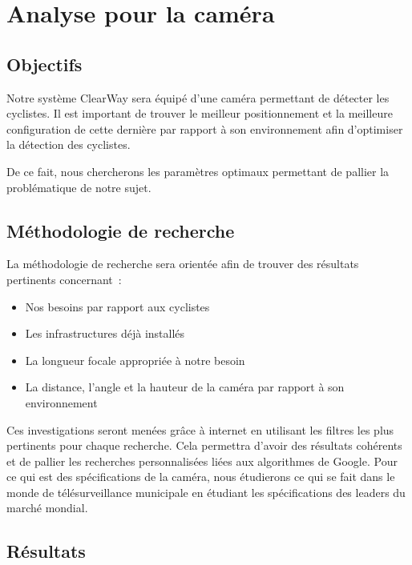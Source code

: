 
\section{Analyse pour la caméra}
\label{sec:camera}

\subsection{Objectifs}
\label{sec:camera_Objectifs}

Notre système ClearWay sera équipé d'une caméra permettant de détecter les cyclistes.
Il est important de trouver le meilleur positionnement et la meilleure configuration
de cette dernière par rapport à son environnement afin d'optimiser la détection des cyclistes.

De ce fait, nous chercherons les paramètres optimaux permettant de pallier la problématique de notre sujet.

\subsection{Méthodologie de recherche}
\label{sec:camera_Methodo}

La méthodologie de recherche sera orientée afin de trouver des résultats pertinents concernant :
\begin{itemize}
    \item Nos besoins par rapport aux cyclistes
    \item Les infrastructures déjà installés
    \item La longueur focale appropriée à notre besoin
    \item La distance, l'angle et la hauteur de la caméra par rapport à son environnement
\end{itemize}
Ces investigations seront menées grâce à internet en utilisant les filtres les plus pertinents pour chaque recherche.
Cela permettra d'avoir des résultats cohérents et de pallier les recherches personnalisées liées aux algorithmes de Google.
Pour ce qui est des spécifications de la caméra, nous étudierons ce qui se fait dans
le monde de télésurveillance municipale en étudiant les spécifications des leaders du marché mondial.

\subsection{Résultats}
\label{sec:camera_resultats}

